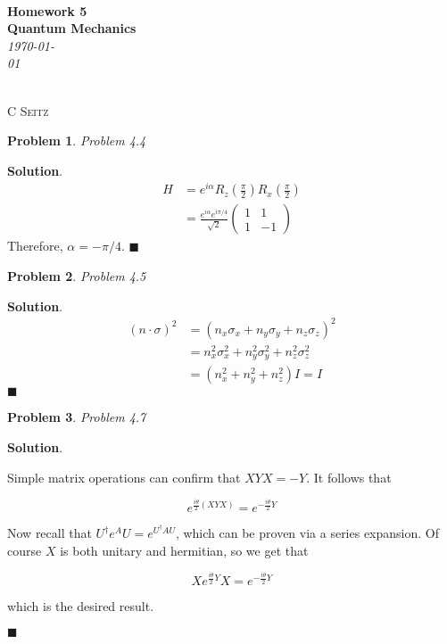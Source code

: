 \documentclass[12pt]{article}
\newtheorem{p}{Problem}
\theoremstyle{definition}
\newenvironment{s}{%
        \begin{trivlist} \item \textbf{Solution}. }{%
            \hspace*{\fill} $\blacksquare$\end{trivlist}}%
\begin{document}
 {\noindent\Huge\bf  \\[0.5\baselineskip] {\selectfont  Homework 5}         }\\[2\baselineskip] %
{ {\bf {}\selectfont Quantum Mechanics}\\ {\textit{\selectfont     \today}}}~~~~~~~~~~~~~~~~~~~~~~~~~~~~~~~~~~~~~~~~~~~~~~~~~~~~~~~~~~~~~~~~~~~~~~~~~~~~~    {\large \textsc{C Seitz}
\\[1.4\baselineskip] 


\begin{p}
Problem 4.4
\end{p}

\begin{s}
\begin{align*}
H &= e^{i\alpha}R_{z}(\frac{\pi}{2})R_{x}(\frac{\pi}{2})\\
&= \frac{e^{i\alpha}e^{i\pi/4}}{\sqrt{2}}
\begin{pmatrix}1 & 1 \\ 1 & -1 \end{pmatrix}
\end{align*}
Therefore, $\alpha = -\pi/4$.
\end{s}

\begin{p}
Problem 4.5
\end{p}

\begin{s}
\begin{align*}
(n\cdot\sigma)^{2} &= (n_{x}\sigma_{x} + n_{y}\sigma_{y} + n_{z}\sigma_{z})^{2}\\
&= n_{x}^{2}\sigma_{x}^{2} + n_{y}^{2}\sigma_{y}^{2} + n_{z}^{2}\sigma_{z}^{2}\\
&= (n_{x}^{2} + n_{y}^{2} + n_{z}^{2})I = I
\end{align*}
\end{s}

\begin{p}
Problem 4.7
\end{p}

\begin{s}

Simple matrix operations can confirm that $XYX = -Y$. It follows that

\begin{equation*}
e^{\frac{i\theta}{2}(XYX)} = e^{-\frac{i\theta}{2}Y}
\end{equation*}

Now recall that $U^{\dagger}e^{A}U = e^{U^{\dagger}A U}$, which can be proven via a series expansion. Of course $X$ is both unitary and hermitian, so we get that 

\begin{equation*}
X e^{\frac{i\theta}{2}Y} X = e^{-\frac{i\theta}{2}Y}
\end{equation*}

which is the desired result.

\end{s}
\end{document}
